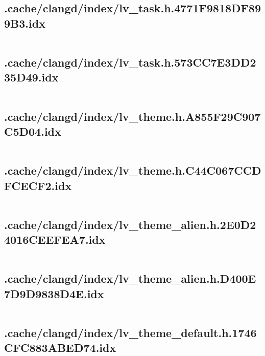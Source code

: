 \subsection{.cache/clangd/index/lv_task.h.4771F9818DF899B3.idx}
\inputminted[linenos,tabsize=2,breaklines, breakanywhere]{c}{lv_task.h.4771F9818DF899B3.idx}
\pagebreak

\subsection{.cache/clangd/index/lv_task.h.573CC7E3DD235D49.idx}
\inputminted[linenos,tabsize=2,breaklines, breakanywhere]{c}{lv_task.h.573CC7E3DD235D49.idx}
\pagebreak

\subsection{.cache/clangd/index/lv_theme.h.A855F29C907C5D04.idx}
\inputminted[linenos,tabsize=2,breaklines, breakanywhere]{c}{lv_theme.h.A855F29C907C5D04.idx}
\pagebreak

\subsection{.cache/clangd/index/lv_theme.h.C44C067CCDFCECF2.idx}
\inputminted[linenos,tabsize=2,breaklines, breakanywhere]{c}{lv_theme.h.C44C067CCDFCECF2.idx}
\pagebreak

\subsection{.cache/clangd/index/lv_theme_alien.h.2E0D24016CEEFEA7.idx}
\inputminted[linenos,tabsize=2,breaklines, breakanywhere]{c}{lv_theme_alien.h.2E0D24016CEEFEA7.idx}
\pagebreak

\subsection{.cache/clangd/index/lv_theme_alien.h.D400E7D9D9838D4E.idx}
\inputminted[linenos,tabsize=2,breaklines, breakanywhere]{c}{lv_theme_alien.h.D400E7D9D9838D4E.idx}
\pagebreak

\subsection{.cache/clangd/index/lv_theme_default.h.1746CFC883ABED74.idx}
\inputminted[linenos,tabsize=2,breaklines, breakanywhere]{c}{lv_theme_default.h.1746CFC883ABED74.idx}
\pagebreak

